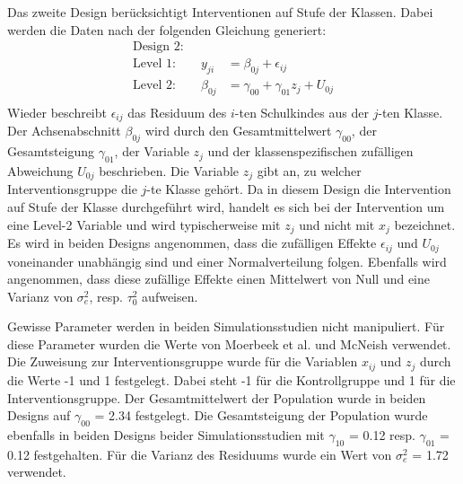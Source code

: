 \documentclass[12pt]{article}\usepackage[]{graphicx}\usepackage[]{color}
\begin{document}
Das zweite Design berücksichtigt Interventionen auf Stufe der Klassen. Dabei werden die Daten nach der folgenden Gleichung generiert:
\begin{equation} 
\begin{split}
 \text{Design 2:}\\
  \text{Level 1:}  \qquad y_{ji} & = \beta_{0j} + \epsilon_{ij}\\
 \text{Level 2:} \qquad \beta_{0j} & = \gamma_{00} + \gamma_{01}z_{j} + U_{0j}\\
\end{split}	
\end{equation} 
Wieder beschreibt $\epsilon_{ij}$ das Residuum des $i$-ten Schulkindes aus der $j$-ten Klasse. Der Achsenabschnitt $\beta_{0j}$ wird durch den Gesamtmittelwert $\gamma_{00}$, der Gesamtsteigung $\gamma_{01}$, der Variable $z_{j}$ und der klassenspezifischen zufälligen Abweichung $U_{0j}$ beschrieben. Die Variable $z_{j}$ gibt an, zu welcher Interventionsgruppe die $j$-te Klasse gehört. Da in diesem Design die Intervention auf Stufe der Klasse durchgeführt wird, handelt es sich bei der Intervention um eine Level-2 Variable und wird typischerweise mit $z_{j}$ und nicht mit $x_{j}$ bezeichnet. Es wird in beiden Designs angenommen, dass die zufälligen Effekte $\epsilon_{ij}$ und $U_{0j}$ voneinander unabhängig sind und einer Normalverteilung folgen. Ebenfalls wird angenommen, dass diese zufällige Effekte einen Mittelwert von Null und eine Varianz von $\sigma^{2}_{e}$, resp. $\tau^{2}_{0}$ aufweisen.

Gewisse Parameter werden in beiden Simulationsstudien nicht manipuliert. Für diese Parameter wurden die Werte von Moerbeek et al. \citeyearpar{MOERBEEK2003341} und McNeish \citeyearpar{mcneish2014analyzing} verwendet. Die Zuweisung zur Interventionsgruppe wurde für die Variablen $x_{ij}$ und $z_{j}$ durch die Werte -1 und 1 festgelegt. Dabei steht -1 für die Kontrollgruppe und 1 für die Interventionsgruppe. Der Gesamtmittelwert der Population wurde in beiden Designs auf $\gamma_{00}$ = 2.34 festgelegt. Die Gesamtsteigung der Population wurde ebenfalls in beiden Designs beider Simulationsstudien mit $\gamma_{10}$ = 0.12 resp. $\gamma_{01}$ = 0.12 festgehalten. Für die Varianz des Residuums wurde ein Wert von $\sigma^{2}_{e}$ = 1.72 verwendet. 
\end{document}
